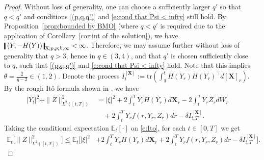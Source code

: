 \documentclass[11pt,reqno]{amsart}
\numberwithin{equation}{section}
\def\E{\mathbb E}
\newcommand{\shortthickbar}{%
  \vcenter{\hbox{\rule{1.8pt}{2.2ex}}}%
}
\newcommand{\thicknm}[1]{%
  \mathopen{\shortthickbar}%
  \mkern4mu #1 \mkern4mu%
  \mathclose{\shortthickbar}%
}
\begin{document}
\begin{proof} 
Without loss of generality, one can choose a sufficiently larger $q'$ so that $q < q'$ and conditions \ref{(p,q,q')} and \eqref{e:cond that Psi < infty} still hold. By Proposition~\ref{prop:bounded by BMO} (where $q < q'$ is required due to the application of Corollary~\ref{cor:int of the solution}), we have 
$\thicknm{(Y,-H(Y))}_{\mathrm X;p,p;k,\infty}<\infty$. Therefore, we may assume further without loss of generality that $q>3$, hence in $q \in (3,4)$, and that $q'$ is chosen sufficiently close to $q$, such that \ref{(p,q,q')} and \eqref{e:cond that Psi < infty} hold. Note that this implies $\theta = {\frac{2}{q-2}} \in (1,2)$. Denote the process $I^{[\mathbf X]}_t := \mathrm{tr} ( \int_{0}^{t} H(Y_{r})H(Y_{r})^{\top} d[\mathbf X]_r)$. By the rough It\^o formula shown in \cite[Theorem~4.19]{dause2026controlled}, we have 
\begin{equation}\label{e:Ito}
\begin{aligned}
|Y_{t}|^2 + \|Z\|^2_{L^{2}([t,T])} &= |\xi|^2 + 2\int_{t}^{T} Y_r H(Y_r) d\mathbf X_r - 2\int_{t}^{T} Y_rZ_r dW_r \\
&\quad + 2\int_{t}^{T}Y_r f(r,Y_r,Z_r) dr - \delta 
I^{[\mathbf X]}_{t,T}. 
\end{aligned}
\end{equation}
Taking the conditional expectation $\E_t[\bm \cdot]$ on \eqref{e:Ito}, for each $t\in[0,T]$ we get 
\begin{equation}\label{e:Ito to Y with smooth X}
\begin{aligned}
\E_{t}\Big[\|Z\|^2_{L^{2}([t,T])}\Big] \le \E_{t}\Big[|\xi|^2 &+ 2\int_{t}^{T} Y_r H(Y_r) d\mathbf X_r + 2\int_{t}^{T}Y_r f(r,Y_r,Z_r) dr - \delta 
I^{[\mathbf X]}_{t,T}\Big].
\end{aligned}
\end{equation}


\end{proof}
\end{document}
